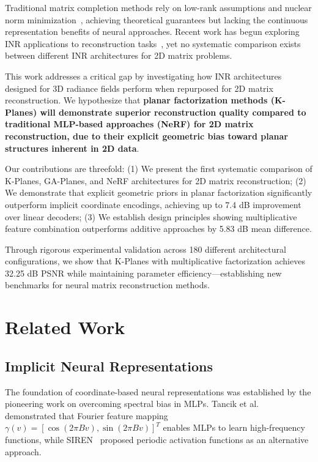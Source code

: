 \documentclass[10pt,twocolumn,letterpaper]{article}
\begin{document}
Traditional matrix completion methods rely on low-rank assumptions and nuclear norm minimization~\cite{candes2009matrix,recht2011simpler}, achieving theoretical guarantees but lacking the continuous representation benefits of neural approaches. Recent work has begun exploring INR applications to reconstruction tasks~\cite{zhang2025lorein,shi2024inr}, yet no systematic comparison exists between different INR architectures for 2D matrix problems.

This work addresses a critical gap by investigating how INR architectures designed for 3D radiance fields perform when repurposed for 2D matrix reconstruction. We hypothesize that \textbf{planar factorization methods (K-Planes) will demonstrate superior reconstruction quality compared to traditional MLP-based approaches (NeRF) for 2D matrix reconstruction, due to their explicit geometric bias toward planar structures inherent in 2D data}.

Our contributions are threefold: (1) We present the first systematic comparison of K-Planes, GA-Planes, and NeRF architectures for 2D matrix reconstruction; (2) We demonstrate that explicit geometric priors in planar factorization significantly outperform implicit coordinate encodings, achieving up to 7.4 dB improvement over linear decoders; (3) We establish design principles showing multiplicative feature combination outperforms additive approaches by 5.83 dB mean difference.

Through rigorous experimental validation across 180 different architectural configurations, we show that K-Planes with multiplicative factorization achieves 32.25 dB PSNR while maintaining parameter efficiency—establishing new benchmarks for neural matrix reconstruction methods.

\section{Related Work}

\subsection{Implicit Neural Representations}

The foundation of coordinate-based neural representations was established by the pioneering work on overcoming spectral bias in MLPs. Tancik et al.~\cite{tancik2020fourier} demonstrated that Fourier feature mapping $\gamma(v) = [\cos(2\pi Bv), \sin(2\pi Bv)]^T$ enables MLPs to learn high-frequency functions, while SIREN~\cite{sitzmann2020siren} proposed periodic activation functions as an alternative approach.
\end{document}
